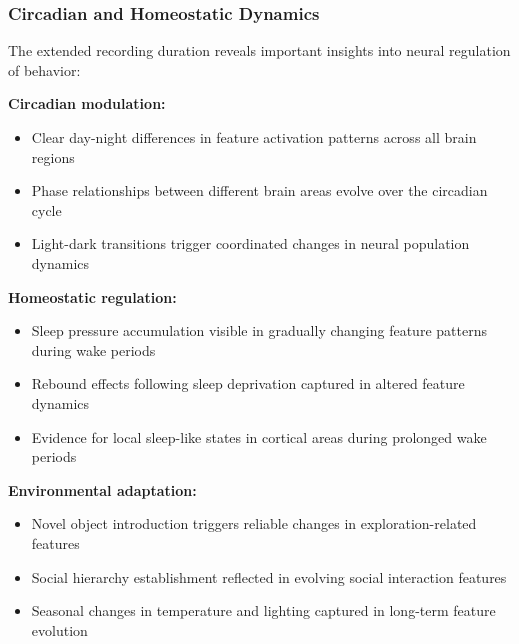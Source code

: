 \subsubsection{Circadian and Homeostatic Dynamics}

The extended recording duration reveals important insights into neural regulation of behavior:

\textbf{Circadian modulation:}
\begin{itemize}
\item Clear day-night differences in feature activation patterns across all brain regions
\item Phase relationships between different brain areas evolve over the circadian cycle
\item Light-dark transitions trigger coordinated changes in neural population dynamics
\end{itemize}

\textbf{Homeostatic regulation:}
\begin{itemize}
\item Sleep pressure accumulation visible in gradually changing feature patterns during wake periods
\item Rebound effects following sleep deprivation captured in altered feature dynamics
\item Evidence for local sleep-like states in cortical areas during prolonged wake periods
\end{itemize}

\textbf{Environmental adaptation:}
\begin{itemize}
\item Novel object introduction triggers reliable changes in exploration-related features
\item Social hierarchy establishment reflected in evolving social interaction features
\item Seasonal changes in temperature and lighting captured in long-term feature evolution
\end{itemize}

